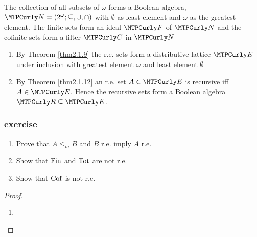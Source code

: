 \documentclass[11pt]{article}
\begin{document}
The collection of all subsets of \(\omega\) forms a Boolean algebra,
\(\caln=(2^\omega;\subseteq,\cup,\cap)\) with \(\emptyset\) as least element
and \(\omega\) as the greatest element. The finite sets form an ideal \(\calf\)
of \(\caln\) and the cofinite sets form a filter \(\calc\) in \(\caln\)


\begin{definition}[]
\begin{enumerate}
\item By Theorem \ref{thm2.1.9} the r.e. sets form a distributive lattice
\(\cale\) under inclusion with greatest element \(\omega\) and least element \(\emptyset\)
\item By Theorem \ref{thm2.1.12} an r.e. set \(A\in\cale\) is recursive iff
\(\bar{A}\in\cale\). Hence the recursive sets form a Boolean algebra \(\calr\subseteq\cale\).
\end{enumerate}
\end{definition}
\subsubsection{exercise}
\label{sec:org624753f}

\begin{exercise}
\label{2.1.16}
\begin{enumerate}
\item Prove that \(A\le_m B\) and \(B\) r.e. imply \(A\) r.e.
\item Show that \(\operatorname{Fin}\) and \(\operatorname{Tot}\) are not r.e.
\item Show that \(\operatorname{Cof}\) is not r.e.
\end{enumerate}
\end{exercise}

\begin{proof}
\begin{enumerate}
\item 
\end{enumerate}
\end{proof}
\end{document}
